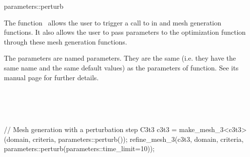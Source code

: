 \ccRefPageBegin

\begin{ccRefFunction}{parameters::perturb}  %


\ccDefinition
  
The function \ccRefName\ allows the user to trigger a call to
 in
 and  mesh generation functions. It also
allows the user to pass parameters 
to the optimization function  through these mesh generation functions.



\ccParameters

The parameters are named parameters. They are the same (i.e. they have the same
name and the same default values) as the parameters of 
function. See its manual page for further details.


\ccSeeAlso

 \\
 \\
 \\


\ccExample

\begin{ccExampleCode}
// Mesh generation with a perturbation step
C3t3 c3t3 = make_mesh_3<c3t3>(domain, criteria, parameters::perturb());
refine_mesh_3(c3t3, domain, criteria, parameters::perturb(parameters::time_limit=10));
\end{ccExampleCode}


\end{ccRefFunction}

\ccRefPageEnd

